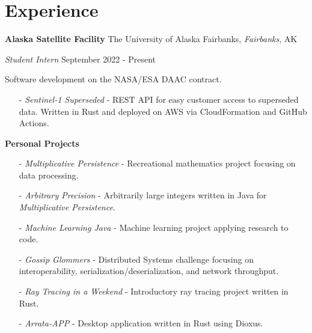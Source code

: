 ﻿\section{Experience}

\textbf{Alaska Satellite Facility} \hfill The University of Alaska Fairbanks, \textit{Fairbanks}, AK

\textit{Student Intern} \hfill {September 2022 - Present}

Software development on the NASA/ESA DAAC contract.

\begin{itemize}
    \item [-] \textit{Sentinel-1 Superseded} - REST API for easy customer access to superseded data. Written in Rust and deployed on AWS via CloudFormation and GitHub Actions.
    
\end{itemize}

\bigbreak

\textbf{Personal Projects}
\begin{itemize}\setlength\itemsep{0.05cm}
    \item [-] \textit{Multiplicative Persistence} - Recreational mathematics project focusing on data processing.
    \item [-] \textit{Arbitrary Precision} - Arbitrarily large integers written in Java for \textit{Multiplicative Persistence}.
    \item [-] \textit{Machine Learning Java} - Machine learning project applying research to code.
    \item [-] \textit{Gossip Glommers} - Distributed Systems challenge focusing on interoperability, serialization/deserialization, and network throughput.
    \item [-] \textit{Ray Tracing in a Weekend} - Introductory ray tracing project written in Rust.
    \item [-] \textit{Arrata-APP} - Desktop application written in Rust using Dioxus.
\end{itemize}